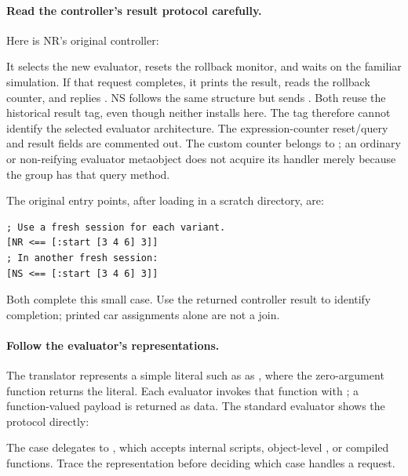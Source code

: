 \paragraph{Read the controller's result protocol carefully.}
Here is NR's original controller:


It selects the new evaluator, resets the rollback monitor, and waits on
the familiar  simulation. If that request completes,
it prints the result, reads the rollback counter, and replies
. NS follows the same structure but sends
. Both reuse the historical  result
tag, even though neither installs  here. The tag
therefore cannot identify the selected evaluator architecture.
The expression-counter reset/query and  result fields are
commented out. The custom counter belongs to ; an
ordinary or non-reifying evaluator metaobject does not acquire its
 handler merely because the group has that query method.

The original entry points, after loading  in a scratch
directory, are:

\begin{codeblock}
\begin{lstlisting}
; Use a fresh session for each variant.
[NR <== [:start [3 4 6] 3]]
; In another fresh session:
[NS <== [:start [3 4 6] 3]]
\end{lstlisting}
\end{codeblock}

Both complete this small case. Use the returned controller result to
identify completion; printed car assignments alone are not a join.

\paragraph{Follow the evaluator's representations.}
The translator represents a simple literal such as  as
, where the zero-argument function
returns the literal. Each evaluator invokes that function with
; a function-valued payload is returned as data.
The standard evaluator shows the protocol directly:


The  case delegates to
, which accepts internal scripts, object-level
, or compiled functions. Trace the representation before
deciding which case handles a request.

